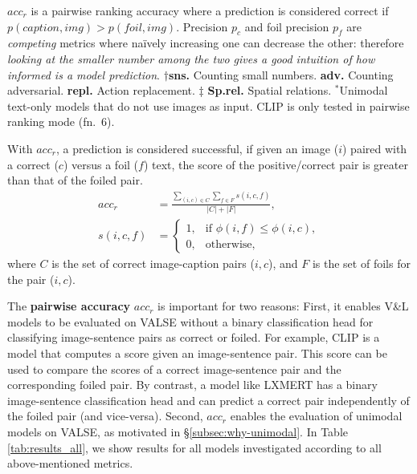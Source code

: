 \documentclass[11pt]{article}
\newcommand{\dataset}{VALSE}
\begin{document}
\begin{table*}[t!]
{    $acc_r$ is a pairwise ranking accuracy where a prediction is considered correct if $p(caption,img) > p(foil,img)$.
    Precision $p_c$ and foil precision $p_f$ are \emph{competing} metrics where na\"{i}vely increasing one can decrease the other: therefore \emph{looking at the smaller number among the two gives a good intuition of how informed is a model prediction}.
    $\dagger${\bf sns.} Counting small numbers. {\bf adv.} Counting adversarial. {\bf repl.} Action replacement. $\ddagger$ {\bf Sp.rel.} Spatial relations. $^*$Unimodal text-only models that do not use images as input. CLIP is only tested in pairwise ranking mode (fn.\ 6).
}
    \label{tab:results_all}
\end{table*} 
With $acc_r$, a prediction is considered successful, if given an image ($i$) paired with a correct ($c$) versus a foil ($f$) text, the score of the positive/correct pair is greater than that of the foiled pair.
\begin{equation*} \label{eq:metric_pairwise}
    \begin{split}
       acc_r &= \frac{\sum_{(i,c) \in C} \sum_{f \in F} s(i,c,f)}{|C| + |F|}, \\
       s(i,c,f) &=
       \begin{cases}
           1, & \text{if } \phi(i, f) \le \phi(i, c),\\
           0, & \text{otherwise,}
       \end{cases}
    \end{split}
\end{equation*}
\noindent
where $C$ is the set of correct image-caption pairs ($i,c$), and $F$ is the set of foils for the pair ($i,c$).

The \textbf{pairwise accuracy} $acc_r$ is important for two reasons: First, it enables V\&L models to be evaluated on \dataset{} without a binary classification head for classifying image-sentence pairs as correct or foiled. For example, CLIP \cite{radford2021learning} is a model that computes a score given an image-sentence pair. This score can be used to compare the scores of a correct image-sentence pair and the corresponding foiled pair.
By contrast, a model like LXMERT \cite{tan-bansal-2019-lxmert} has a binary image-sentence classification head and can predict a correct pair independently of the foiled pair (and vice-versa). Second, $acc_r$ enables the evaluation of unimodal models on \dataset{}, as motivated 
in \S \ref{subsec:why-unimodal}.
In Table \ref{tab:results_all}, we show results for all models investigated according to all above-mentioned metrics.
\end{document}
